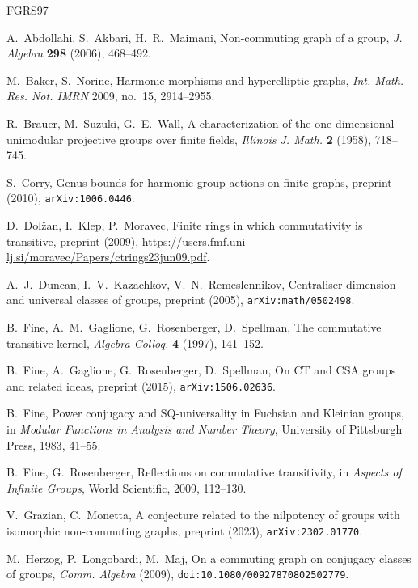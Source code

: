 \documentclass[12pt,letterpaper]{article}
\numberwithin{equation}{section}
\theoremstyle{plain}
\theoremstyle{definition}
\begin{document}
\begin{thebibliography}{FGRS97}

 A.~Abdollahi, S.~Akbari, H.~R.~Maimani,
Non-commuting graph of a group, \emph{J. Algebra} \textbf{298} (2006),
468--492.

 M.~Baker, S.~Norine, Harmonic morphisms and
hyperelliptic graphs, \emph{Int. Math. Res. Not. IMRN} 2009, no.~15,
2914--2955.

 R.~Brauer, M.~Suzuki, G.~E.~Wall, A characterization
of the one-dimensional unimodular projective groups over finite fields,
\emph{Illinois J. Math.} \textbf{2} (1958), 718--745.

 S.~Corry, Genus bounds for harmonic group actions on
finite graphs, preprint (2010), \texttt{arXiv:1006.0446}.

 D.~Dol\v{z}an, I.~Klep, P.~Moravec, Finite rings in
which commutativity is transitive, preprint (2009),
\url{https://users.fmf.uni-lj.si/moravec/Papers/ctrings23jun09.pdf}.

 A.~J.~Duncan, I.~V.~Kazachkov, V.~N.~Remeslennikov,
Centraliser dimension and universal classes of groups, preprint (2005),
\texttt{arXiv:math/0502498}.

 B.~Fine, A.~M.~Gaglione, G.~Rosenberger,
D.~Spellman, The commutative transitive kernel, \emph{Algebra Colloq.}
\textbf{4} (1997), 141--152.

 B.~Fine, A.~Gaglione, G.~Rosenberger,
D.~Spellman, On CT and CSA groups and related ideas, preprint (2015),
\texttt{arXiv:1506.02636}.

 B.~Fine, Power conjugacy and SQ-universality in
Fuchsian and Kleinian groups, in \emph{Modular Functions in Analysis and
Number Theory}, University of Pittsburgh Press, 1983, 41--55.

 B.~Fine, G.~Rosenberger, Reflections on commutative
transitivity, in \emph{Aspects of Infinite Groups}, World Scientific, 2009,
112--130.

 V.~Grazian, C.~Monetta, A conjecture related to the
nilpotency of groups with isomorphic non-commuting graphs, preprint (2023),
\texttt{arXiv:2302.01770}.

 M.~Herzog, P.~Longobardi, M.~Maj, On a commuting
graph on conjugacy classes of groups, \emph{Comm. Algebra} (2009),
\texttt{doi:10.1080/00927870802502779}.


\end{thebibliography}
\end{document}
